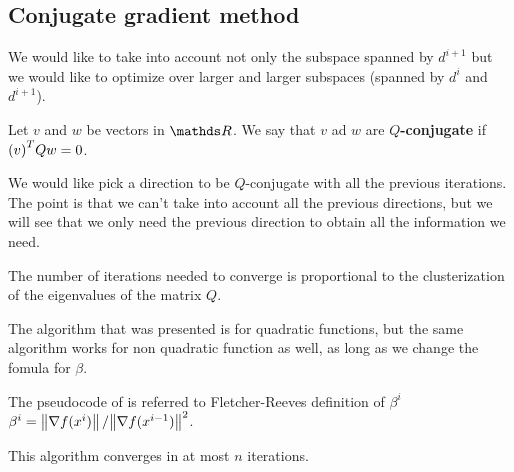 \documentclass[computational_mathematics.tex]{subfiles}
\begin{document}
\subsection{Conjugate gradient method}



We would like to take into account not only the subspace spanned by $d^{i+1}$ but we would like to optimize over larger and larger subspaces (spanned by $d^i$ and $d^{i+1}$).

\begin{definition}[Q-conjugate]
Let $v$ and $w$ be vectors in $\R$. We say that $v$ ad $w$ are \textbf{$Q$-conjugate} if ${(v)}^{T} Q w = 0$.
\end{definition}

We would like pick a direction to be $Q$-conjugate with all the previous iterations. The point is that we can't take into account all the previous directions, but we will see that we only need the previous direction to obtain all the information we need.


The number of iterations needed to converge is proportional to the clusterization of the eigenvalues of the matrix $Q$.

The algorithm that was presented is for quadratic functions, but the same algorithm works for non quadratic function as well, as long as we change the fomula for $\beta$.

The pseudocode of  is referred to Fletcher-Reeves definition of $\beta^i$ $\beta^i = \left\lVert\nabla f(x^i)\right\rVert / {\left\lVert\nabla f(x^{i-1})\right\rVert}^2$.

This algorithm converges in at most $n$ iterations.
\end{document}
